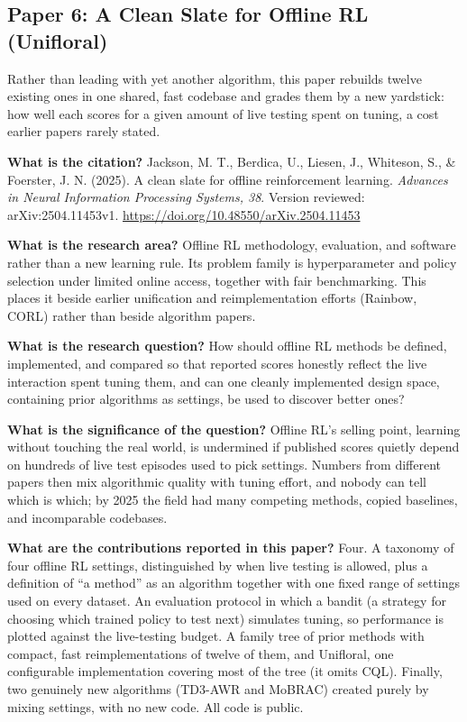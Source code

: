 \documentclass[11pt]{article}
\newcommand{\paper}[1]{\subsection*{#1}}
\newcommand{\q}[2]{\item \textbf{#1} #2}
\begin{document}
\paper{Paper 6: A Clean Slate for Offline RL (Unifloral)}
Rather than leading with yet another algorithm, this paper rebuilds twelve existing ones in one shared, fast codebase and grades them by a new yardstick: how well each scores for a given amount of live testing spent on tuning, a cost earlier papers rarely stated.
\begin{qna}

\q{What is the citation?}
Jackson, M. T., Berdica, U., Liesen, J., Whiteson, S., \& Foerster, J. N. (2025). A clean slate for offline reinforcement learning. \emph{Advances in Neural Information Processing Systems, 38}. Version reviewed: arXiv:2504.11453v1. \url{https://doi.org/10.48550/arXiv.2504.11453}

\q{What is the research area?}
Offline RL methodology, evaluation, and software rather than a new learning rule. Its problem family is hyperparameter and policy selection under limited online access, together with fair benchmarking. This places it beside earlier unification and reimplementation efforts (Rainbow, CORL) rather than beside algorithm papers.

\q{What is the research question?}
How should offline RL methods be defined, implemented, and compared so that reported scores honestly reflect the live interaction spent tuning them, and can one cleanly implemented design space, containing prior algorithms as settings, be used to discover better ones?

\q{What is the significance of the question?}
Offline RL's selling point, learning without touching the real world, is undermined if published scores quietly depend on hundreds of live test episodes used to pick settings. Numbers from different papers then mix algorithmic quality with tuning effort, and nobody can tell which is which; by 2025 the field had many competing methods, copied baselines, and incomparable codebases.

\q{What are the contributions reported in this paper?}
Four. A taxonomy of four offline RL settings, distinguished by when live testing is allowed, plus a definition of ``a method'' as an algorithm together with one fixed range of settings used on every dataset. An evaluation protocol in which a bandit (a strategy for choosing which trained policy to test next) simulates tuning, so performance is plotted against the live-testing budget. A family tree of prior methods with compact, fast reimplementations of twelve of them, and Unifloral, one configurable implementation covering most of the tree (it omits CQL). Finally, two genuinely new algorithms (TD3-AWR and MoBRAC) created purely by mixing settings, with no new code. All code is public.


\end{qna}
\end{document}
